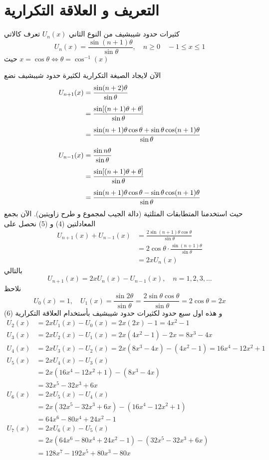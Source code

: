 \section{التعريف و العلاقة التكرارية}
\begin{definition}
	كثيرات حدود شيبشيف من النوع الثاني $U_n(x)$ تعرف كالاتي
	\[
	U_n(x) = \frac{\sin(n+1)\theta}{\sin\theta},\quad n\geq 0 \quad -1 \leq x \leq 1
	\]
	حيث $x=\cos\theta \iff \theta = \cos^{-1}(x)$
\end{definition}
\noindent
الآن لايجاد الصيغة التكرارية لكثيرة حدود شيبشيف نضع
\begin{align}
U_{n+1} (x) &= \frac{\sin(n+2)\theta}{\sin\theta}\notag\\[5pt]
&= \frac{\sin[(n+1)\theta + \theta]}{\sin \theta}\notag\\[5pt]
&= \frac{\sin(n+1)\theta\cos\theta + \sin\theta\cos(n+1)\theta}{\sin\theta}\\[5pt]
	U_{n-1} (x) &= \frac{\sin n\theta}{\sin\theta}\notag\\[5pt]
&= \frac{\sin[(n+1)\theta + \theta]}{\sin \theta}\notag\\[5pt]
 &= \frac{\sin(n+1)\theta\cos\theta - \sin\theta\cos(n+1)\theta}{\sin\theta}
\end{align}
حيث استخدمنا المتطابقات المثلثية (دالة الجيب لمجموع و طرح زاويتين). الآن  بجمع المعادلتين (4) و (5) نحصل على
\begin{align*}
	U_{n+1}(x) + U_{n-1}(x) &= \frac{2\sin(n+1)\theta\cos\theta}{\sin\theta}\\
   &= 2\cos\theta \cdot \frac{\sin(n+1)\theta}{\sin \theta}\\
   &= 2x U_n(x)
\end{align*}
بالتالي
\begin{equation}
	\boxed{U_{n+1}(x) = 2x U_n(x) - U_{n-1}(x), \quad n = 1,2,3,\dots}
\end{equation}
نلاحظ
\[
U_0(x) = 1, \quad U_1(x) = \frac{\sin2\theta}{\sin\theta} = \frac{2\sin \theta\cos\theta}{\sin\theta}= 2\cos\theta=2x
\]
و هذه اول سبع حدود لكثيرات حدود شيبشيف بأستخدام العلاقة التكرارية (6)
\begin{align*}
	U_2(x) &= 2x U_1(x) - U_0(x) = 2x(2x) - 1 = 4x^2 - 1\\
	U_3(x) &= 2x U_2(x) - U_1(x) = 2x(4x^2 - 1) - 2x =8x^3 - 4x\\
	U_4(x) &= 2x U_3(x) - U_2(x) = 2x(8x^3 - 4x) - (4x^2 - 1) = 16x^4 - 12x^2 + 1\\
		U_5(x) &= 2xU_4(x) - U_3(x) \\ 
		&= 2x(16x^4 - 12x^2 + 1) - (8x^3 - 4x)\\
		&= 32 x^5 - 32x^3 + 6x\\
		U_6(x) &= 2x U_5(x) - U_4(x) \\
		&= 2x(32 x^5 - 32x^3 + 6x) - (16x^4 - 12x^2 + 1)\\
		&= 64 x^6 - 80x^4 + 24x^2 - 1\\
		U_7(x) &= 2x U_6(x) - U_5(x) \\
		&= 2x(64 x^6 - 80x^4 + 24x^2 - 1) - (32 x^5 - 32x^3 + 6x)\\
		&= 128 x^7 - 192x^5 + 80 x^3 - 80 x
\end{align*}

